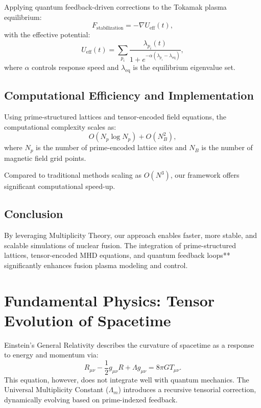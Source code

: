 \documentclass{article}
\theoremstyle{plain}
\begin{document}
\begin{itemize}
\begin{itemize}
Applying quantum feedback-driven corrections to the Tokamak plasma equilibrium:
\begin{equation}
    F_{\text{stabilization}} = -\nabla U_{\text{eff}}(t),
\end{equation}
with the effective potential:
\begin{equation}
    U_{\text{eff}}(t) = \sum_{p_i} \frac{\lambda_{p_i}(t)}{1 + e^{-\alpha (\lambda_{p_i} - \lambda_{\text{eq}})}},
\end{equation}
where $\alpha$ controls response speed and $\lambda_{\text{eq}}$ is the equilibrium eigenvalue set.

\subsection{Computational Efficiency and Implementation}

Using prime-structured lattices and tensor-encoded field equations, the computational complexity scales as:
\begin{equation}
    O(N_p \log N_p) + O(N_B^2),
\end{equation}
where $N_p$ is the number of prime-encoded lattice sites and $N_B$ is the number of magnetic field grid points.

Compared to traditional methods scaling as $O(N^3)$, our framework offers significant computational speed-up.

\subsection{Conclusion}
By leveraging Multiplicity Theory, our approach enables faster, more stable, and scalable simulations of nuclear fusion. The integration of prime-structured lattices, tensor-encoded MHD equations, and quantum feedback loops** significantly enhances fusion plasma modeling and control.
\section{Fundamental Physics: Tensor Evolution of Spacetime}
Einstein's General Relativity describes the curvature of spacetime as a response to energy and momentum via:
\begin{equation}
    R_{\mu\nu} - \frac{1}{2} g_{\mu\nu} R + \Lambda g_{\mu\nu} = 8\pi G T_{\mu\nu}.
\end{equation}
This equation, however, does not integrate well with quantum mechanics. The Universal Multiplicity Constant ($\Lambda_m$) introduces a recursive tensorial correction, dynamically evolving based on prime-indexed feedback.


\end{itemize}
\end{itemize}
\end{document}
